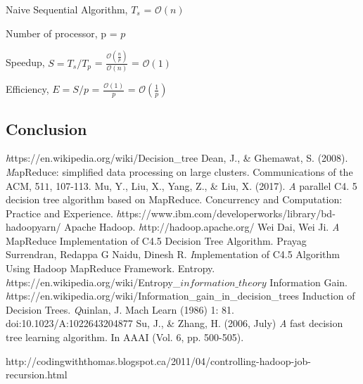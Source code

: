 \documentclass{article}
\begin{document}
Naive Sequential Algorithm, ${T_{s}}$ = $\mathcal{O}(n)$

Number of processor, p = $p$

Speedup, ${S = T_{s}/T_{p}}$ = $\frac{\mathcal{O}(\frac{n}{p})}{\mathcal{O}(n)}$ = $\mathcal{O}(1)$

Efficiency, ${E = S/p}$ = $\frac{\mathcal{O}(1)}{p}$ = $\mathcal{O}(\frac{1}{p})$

\subsection{Conclusion}

\begin{thebibliography}{9}
\textit https://en.wikipedia.org/wiki/Decision\_tree
Dean, J., \& Ghemawat, S. (2008).
\textit MapReduce: simplified data processing on large clusters. Communications of the ACM, 51\(1\), 107-113.
Mu, Y., Liu, X., Yang, Z., \& Liu, X. (2017).
\textit A parallel C4. 5 decision tree algorithm based on MapReduce. Concurrency and Computation: Practice and Experience.
\textit https://www.ibm.com/developerworks/library/bd-hadoopyarn/
Apache Hadoop.
\textit http://hadoop.apache.org/
Wei Dai, Wei Ji.
\textit A MapReduce Implementation of C4.5 Decision Tree Algorithm.
Prayag Surrendran, Redappa G Naidu, Dinesh R.
\textit Implementation of C4.5 Algorithm Using Hadoop MapReduce Framework.
Entropy.
\textit https://en.wikipedia.org/wiki/Entropy\_\(information\_theory\)
Information Gain.
\textit https://en.wikipedia.org/wiki/Information\_gain\_in\_decision\_trees
Induction of Decision Trees.
\textit Quinlan, J. Mach Learn (1986) 1: 81. doi:10.1023/A:1022643204877
 Su, J., \& Zhang, H. (2006, July)
\textit A fast decision tree learning algorithm. In AAAI (Vol. 6, pp. 500-505).
\end{thebibliography}
http://codingwiththomas.blogspot.ca/2011/04/controlling-hadoop-job-recursion.html
\end{document}
